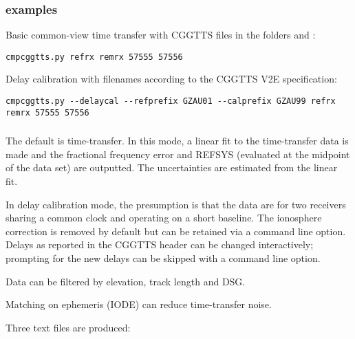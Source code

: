 \subsubsection{examples}

Basic common-view time transfer with CGGTTS files in the folders  and :
\begin{lstlisting}[mathescape=true]
cmpcggtts.py refrx remrx 57555 57556
\end{lstlisting}

Delay calibration with filenames according to the CGGTTS V2E specification:
\begin{lstlisting}[mathescape=true]
cmpcggtts.py --delaycal --refprefix GZAU01 --calprefix GZAU99 refrx remrx 57555 57556
\end{lstlisting}

\subsubsection{}

The default is time-transfer. In this mode, a linear fit to the time-transfer data is made and the 
fractional frequency error and REFSYS (evaluated at the midpoint of the data set) are outputted. 
The uncertainties are estimated from the linear fit.

In delay calibration mode, the presumption is that the data are for two receivers sharing a
common clock and operating on a short baseline. The ionosphere correction is removed by default
but can be retained via a command line option. Delays as reported in the CGGTTS header can be 
changed interactively; prompting for the new delays can be skipped with a command line option.


Data can be filtered by elevation, track length and DSG.

Matching on ephemeris (IODE) can reduce time-transfer noise.

Three text files are produced:




